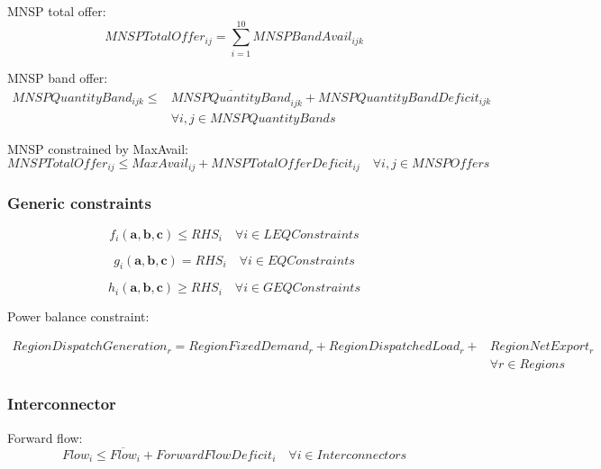 \documentclass{article}
\begin{document}
MNSP total offer:
\begin{equation}
MNSPTotalOffer_{ij} = \sum\limits_{i = 1}^{10} MNSPBandAvail_{ijk}
\end{equation}

MNSP band offer:
\begin{equation}
\begin{split}
MNSPQuantityBand_{ijk} \leq & \overline{MNSPQuantityBand}_{ijk} + MNSPQuantityBandDeficit_{ijk} \\
& \forall i,j \in MNSPQuantityBands
\end{split}
\end{equation}

MNSP constrained by MaxAvail:
\begin{equation}
MNSPTotalOffer_{ij} \leq MaxAvail_{ij} + MNSPTotalOfferDeficit_{ij} \quad \forall i,j \in MNSPOffers 
\end{equation}

\subsubsection{Generic constraints}
\begin{equation}
	f_{i}(\bm{a}, \bm{b}, \bm{c}) \leq RHS_{i} \quad \forall i \in LEQConstraints
\end{equation}

\begin{equation}
	g_{i}(\bm{a}, \bm{b}, \bm{c}) = RHS_{i} \quad \forall i \in EQConstraints
\end{equation}

\begin{equation}
	h_{i}(\bm{a}, \bm{b}, \bm{c}) \geq RHS_{i} \quad \forall i \in GEQConstraints
\end{equation}

Power balance constraint:

\begin{equation}
\begin{split}
RegionDispatchGeneration_{r} = RegionFixedDemand_{r} + RegionDispatchedLoad_{r} + & RegionNetExport_{r} \\
& \forall r \in Regions
\end{split}
\end{equation}

\subsubsection{Interconnector}
Forward flow:
\begin{equation}
Flow_{i} \leq \overline{Flow}_{i} + ForwardFlowDeficit_{i} \quad \forall i \in Interconnectors
\end{equation}
\end{document}
